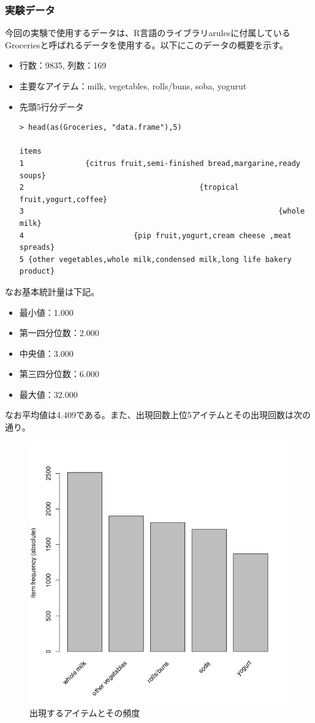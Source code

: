 \documentclass[dvipdfmx]{jsarticle}
\begin{document}
  \subsubsection{実験データ}
  今回の実験で使用するデータは、R言語のライブラリarulesに付属しているGroceriesと呼ばれるデータを使用する。以下にこのデータの概要を示す。
  \begin{itemize}
    \item 行数：9835, 列数：169
    \item 主要なアイテム：milk, vegetables, rolls/buns, soba, yogurut
    \item 先頭5行分データ
    \begin{verbatim}
> head(as(Groceries, "data.frame"),5)
                                                                  items
1              {citrus fruit,semi-finished bread,margarine,ready soups}
2                                        {tropical fruit,yogurt,coffee}
3                                                          {whole milk}
4                         {pip fruit,yogurt,cream cheese ,meat spreads}
5 {other vegetables,whole milk,condensed milk,long life bakery product}

    \end{verbatim}
  \end{itemize}
なお基本統計量は下記。
  \begin{itemize}
    \item 最小値：1.000
    \item 第一四分位数：2.000
    \item 中央値：3.000
    \item 第三四分位数：6.000
    \item 最大値：32.000
  \end{itemize}
  なお平均値は4.409である。また、出現回数上位5アイテムとその出現回数は次の通り。
  \begin{figure}[H]
    \centering
    \includegraphics[scale=0.4]{images/groceri_freq.png}
    \caption{出現するアイテムとその頻度}
  \end{figure}
\end{document}
